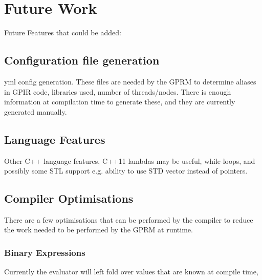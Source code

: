 \chapter{Future Work}

Future Features that could be added:

\section{Configuration file generation}
    yml config generation.
    These files are needed by the GPRM to determine aliases in GPIR code, libraries used,
    number of threads/nodes. There is enough information at compilation time to generate these,
    and they are currently generated manually. 


\section{Language Features}
    Other C++ language features, C++11 lambdas may be useful,
    while-loops, and possibly some STL support e.g. ability to use STD vector instead of pointers.

\section{Compiler Optimisations}

    There are a few optimisations that can be performed by the compiler to reduce the work needed to be 
    performed by the GPRM at runtime.

\subsection{Binary Expressions}
    Currently the evaluator will left fold over values that are known at compile time,


